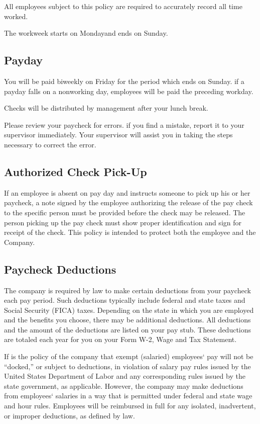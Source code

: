 All employees subject to this policy are required to accurately record all time worked.

The workweek starts on Mondayand ends on Sunday.

\subsection{Payday}

You will be paid biweekly on Friday for the period which ends on Sunday. if a payday falls on a nonworking day, employees will be paid the preceding workday.

Checks will be distributed by management after your lunch break.

Please review your paycheck for errors. if you find a mistake, report it to your supervisor immediately. Your supervisor will assist you in taking the steps necessary to correct the error.

\subsection{Authorized Check Pick-Up}

If an employee is absent on pay day and instructs someone to pick up his or her paycheck, a note signed by the employee authorizing the release of the pay check to the specific person must be provided before the check may be released. The person picking up the pay check must show proper identification and sign for receipt of the check. This policy is intended to protect both the employee and the Company.

\subsection{Paycheck Deductions}

The company is required by law to make certain deductions from your paycheck each pay period. Such deductions typically include federal and state taxes and Social Security (FICA) taxes. Depending on the state in which you are employed and the benefits you choose, there may be additional deductions. All deductions and the amount of the deductions are listed on your pay stub. These deductions are totaled each year for you on your Form W-2, Wage and Tax Statement.

If is the policy of the company that exempt (salaried) employees‘ pay will not be “docked,” or subject to deductions, in violation of salary pay rules issued by the United States Department of Labor and any corresponding rules issued by the state government, as applicable. However, the company may make deductions from employees‘ salaries in a way that is permitted under federal and state wage and hour rules. Employees will be reimbursed in full for any isolated, inadvertent, or improper deductions, as defined by law.

